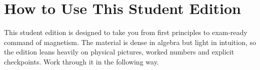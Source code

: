 \documentclass[11pt,a4paper]{article}
\begin{document}
\vspace{0.3cm}

\section*{How to Use This Student Edition}

This student edition is designed to take you from first principles to exam-ready command of magnetism. The material is dense in algebra but light in intuition, so the edition leans heavily on physical pictures, worked numbers and explicit checkpoints. Work through it in the following way.
\end{document}
